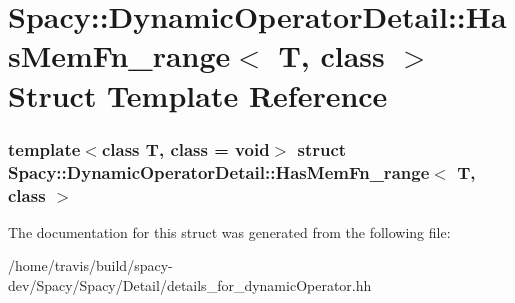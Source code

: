 \hypertarget{structSpacy_1_1DynamicOperatorDetail_1_1HasMemFn__range}{\section{\-Spacy\-:\-:\-Dynamic\-Operator\-Detail\-:\-:\-Has\-Mem\-Fn\-\_\-range$<$ \-T, class $>$ \-Struct \-Template \-Reference}
\label{structSpacy_1_1DynamicOperatorDetail_1_1HasMemFn__range}
}
\subsubsection*{template$<$class T, class = void$>$ struct Spacy\-::\-Dynamic\-Operator\-Detail\-::\-Has\-Mem\-Fn\-\_\-range$<$ T, class $>$}



\-The documentation for this struct was generated from the following file\-:\begin{DoxyCompactItemize}
\item 
/home/travis/build/spacy-\/dev/\-Spacy/\-Spacy/\-Detail/details\-\_\-for\-\_\-dynamic\-Operator.\-hh\end{DoxyCompactItemize}
